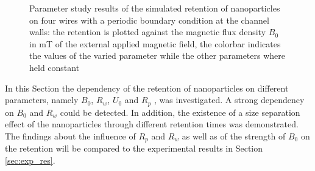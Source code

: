 \begin{figure}
         \caption[Parameter study results of the simulated retention of nanoparticles on four wires with a periodic boundary condition at the channel walls]{Parameter study results of the simulated retention of nanoparticles on four wires with a periodic boundary condition at the channel walls: the retention is plotted against the magnetic flux density $B_{0}$ in mT of the external applied magnetic field, the colorbar indicates the values of the varied parameter while the other parameters where held constant
         }
        \label{fig:fw_param_res_periodicBC}
  \end{figure} 

\FloatBarrier
In this Section the dependency of the retention of nanoparticles on different parameters, namely $B_{0}$, $R_{w}$, $U_{0}$ and $R_{p}$ , was investigated. A strong dependency on $B_{0}$ and $R_{w}$ could be detected. In addition, the existence of a size separation effect of the nanoparticles through different retention times was demonstrated. The findings about the influence of $R_{p}$ and $R_{w}$ as well as of the strength of $B_{0}$ on the retention will be compared to the experimental results in Section\,\ref{sec:exp_res}.


